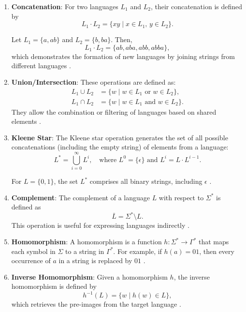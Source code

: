 \begin{enumerate}
    \item \textbf{Concatenation}: For two languages $L_1$ and $L_2$, their concatenation is defined by 
    \[
    L_1 \cdot L_2 = \{xy \mid x \in L_1,\, y \in L_2\}.
    \]
    \begin{example}
    Let $L_1 = \{a, ab\}$ and $L_2 = \{b, ba\}$. Then,
    \[
    L_1 \cdot L_2 = \{ab, aba, abb, abba\},
    \]
    which demonstrates the formation of new languages by joining strings from different languages \cite{sipser2013introduction}.
    \end{example}

    \item \textbf{Union/Intersection}: These operations are defined as:
    \begin{align*}
        L_1 \cup L_2 &= \{w \mid w \in L_1 \text{ or } w \in L_2\}, \\
        L_1 \cap L_2 &= \{w \mid w \in L_1 \text{ and } w \in L_2\}.
    \end{align*}
    They allow the combination or filtering of languages based on shared elements \cite{sipser2013introduction}.

    \item \textbf{Kleene Star}: The Kleene star operation generates the set of all possible concatenations (including the empty string) of elements from a language:
    \[
    L^\ast = \bigcup_{i=0}^\infty L^i, \quad \text{where } L^0 = \{\epsilon\} \text{ and } L^i = L \cdot L^{i-1}.
    \]
    \begin{example}
        For $L = \{0, 1\}$, the set $L^\ast$ comprises all binary strings, including $\epsilon$ \cite{sipser2013introduction}.
    \end{example}

    \item \textbf{Complement}: The complement of a language $L$ with respect to $\Sigma^\ast$ is defined as 
    \[
    \overline{L} = \Sigma^\ast \setminus L.
    \]
    This operation is useful for expressing languages indirectly \cite{sipser2013introduction}.  

    \item \textbf{Homomorphism}: A homomorphism is a function $h: \Sigma^\ast \to \Gamma^\ast$ that maps each symbol in $\Sigma$ to a string in $\Gamma^\ast$. For example, if $h(a) = 01$, then every occurrence of $a$ in a string is replaced by $01$ \cite{sipser2013introduction}.

    \item \textbf{Inverse Homomorphism}: Given a homomorphism $h$, the inverse homomorphism is defined by 
    \[
    h^{-1}(L) = \{w \mid h(w) \in L\},
    \]
    which retrieves the pre-images from the target language \cite{sipser2013introduction}.
\end{enumerate}

